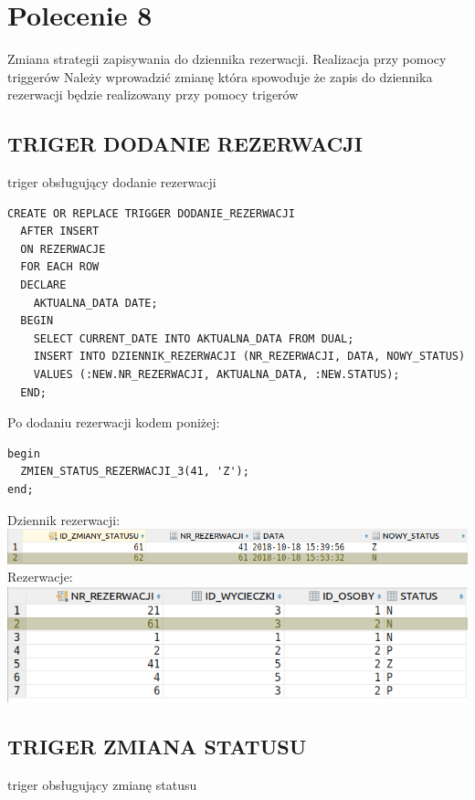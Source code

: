 \newpage

\section{Polecenie 8}

Zmiana strategii zapisywania do dziennika rezerwacji. Realizacja przy pomocy triggerów
Należy wprowadzić zmianę która spowoduje że zapis do dziennika rezerwacji będzie realizowany
przy pomocy trigerów

\subsection{TRIGER DODANIE REZERWACJI}
triger obsługujący dodanie rezerwacji

\begin{verbatim}
CREATE OR REPLACE TRIGGER DODANIE_REZERWACJI
  AFTER INSERT
  ON REZERWACJE
  FOR EACH ROW
  DECLARE
    AKTUALNA_DATA DATE;
  BEGIN
    SELECT CURRENT_DATE INTO AKTUALNA_DATA FROM DUAL;
    INSERT INTO DZIENNIK_REZERWACJI (NR_REZERWACJI, DATA, NOWY_STATUS)
    VALUES (:NEW.NR_REZERWACJI, AKTUALNA_DATA, :NEW.STATUS);
  END;
\end{verbatim}

Po dodaniu rezerwacji kodem poniżej:
\begin{verbatim}
begin
  ZMIEN_STATUS_REZERWACJI_3(41, 'Z');
end;
\end{verbatim}

Dziennik rezerwacji:\\
\includegraphics[width=\linewidth]{./images/triger_dodaj_rezerwacje.png}
Rezerwacje:\\
\includegraphics[width=\linewidth]{./images/triger_dodaj_rezerwacje_.png}

\subsection{TRIGER ZMIANA STATUSU}
triger obsługujący zmianę statusu

